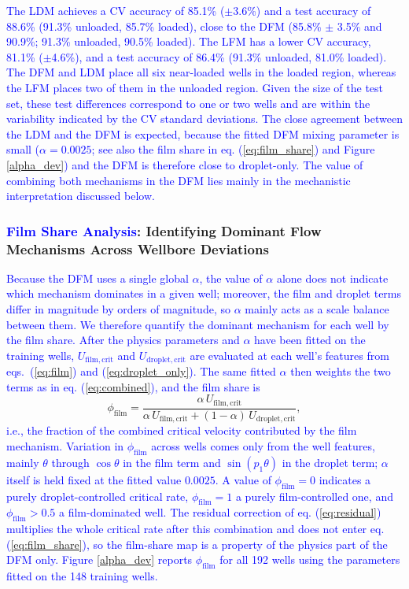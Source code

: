 \documentclass[journal=jacsat,manuscript=article]{achemso}
\newcommand{\al}{\textcolor{blue}}
\theoremstyle{thmstyleone}%
\theoremstyle{thmstyletwo}%
\theoremstyle{thmstylethree}%
\begin{document}
\al{The LDM achieves a CV accuracy of 85.1\% ($\pm$3.6\%) and a test accuracy of 88.6\% (91.3\% unloaded, 85.7\% loaded), close to the DFM (85.8\% $\pm$ 3.5\% and 90.9\%; 91.3\% unloaded, 90.5\% loaded). The LFM has a lower CV accuracy, 81.1\% ($\pm$4.6\%), and a test accuracy of 86.4\% (91.3\% unloaded, 81.0\% loaded). The DFM and LDM place all six near-loaded wells in the loaded region, whereas the LFM places two of them in the unloaded region. Given the size of the test set, these test differences correspond to one or two wells and are within the variability indicated by the CV standard deviations. The close agreement between the LDM and the DFM is expected, because the fitted DFM mixing parameter is small ($\alpha = 0.0025$; see also the film share in eq. (\ref{eq:film_share}) and Figure \ref{alpha_dev}) and the DFM is therefore close to droplet-only. The value of combining both mechanisms in the DFM lies mainly in the mechanistic interpretation discussed below.} 

\subsubsection*{\al{Film Share Analysis}: Identifying Dominant Flow Mechanisms Across Wellbore Deviations}

\al{Because the DFM uses a single global $\alpha$, the value of $\alpha$ alone does not indicate which mechanism dominates in a given well; moreover, the film and droplet terms differ in magnitude by orders of magnitude, so $\alpha$ mainly acts as a scale balance between them. We therefore quantify the dominant mechanism for each well by the film share. After the physics parameters and $\alpha$ have been fitted on the training wells, $U_{\mathrm{film,crit}}$ and $U_{\mathrm{droplet,crit}}$ are evaluated at each well's features from eqs.\ (\ref{eq:film}) and (\ref{eq:droplet_only}). The same fitted $\alpha$ then weights the two terms as in eq. (\ref{eq:combined}), and the film share is}
\begin{equation}
\phi_{\text{film}} = \frac{\alpha\, U_{\mathrm{film,crit}}}{\alpha\, U_{\mathrm{film,crit}} + (1-\alpha)\, U_{\mathrm{droplet,crit}}},
\label{eq:film_share}
\end{equation}
\al{i.e., the fraction of the combined critical velocity contributed by the film mechanism. Variation in $\phi_{\text{film}}$ across wells comes only from the well features, mainly $\theta$ through $\cos\theta$ in the film term and $\sin(p_1\theta)$ in the droplet term; $\alpha$ itself is held fixed at the fitted value $0.0025$. A value of $\phi_{\text{film}} = 0$ indicates a purely droplet-controlled critical rate, $\phi_{\text{film}} = 1$ a purely film-controlled one, and $\phi_{\text{film}} > 0.5$ a film-dominated well. The residual correction of eq. (\ref{eq:residual}) multiplies the whole critical rate after this combination and does not enter eq. (\ref{eq:film_share}), so the film-share map is a property of the physics part of the DFM only. Figure \ref{alpha_dev} reports $\phi_{\text{film}}$ for all 192 wells using the parameters fitted on the 148 training wells.}
\end{document}
